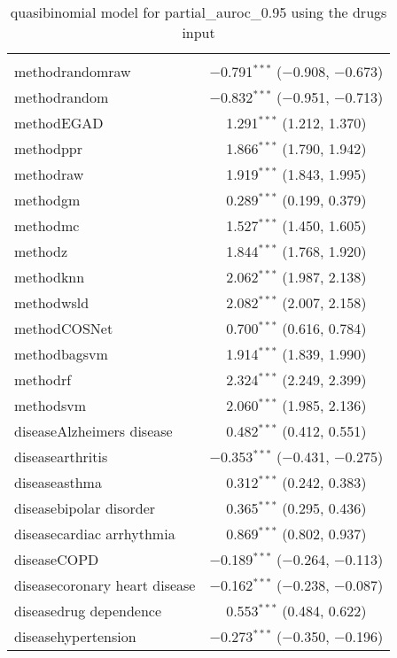 
\begin{table}[!htbp] \centering 
  \caption{quasibinomial model for partial_auroc_0.95 using the drugs input} 
  \label{} 
\begin{tabular}{@{\extracolsep{5pt}}lc} 
\\[-1.8ex]\hline 
\hline \\[-1.8ex] 
 methodrandomraw & $-$0.791$^{***}$ ($-$0.908, $-$0.673) \\ 
  methodrandom & $-$0.832$^{***}$ ($-$0.951, $-$0.713) \\ 
  methodEGAD & 1.291$^{***}$ (1.212, 1.370) \\ 
  methodppr & 1.866$^{***}$ (1.790, 1.942) \\ 
  methodraw & 1.919$^{***}$ (1.843, 1.995) \\ 
  methodgm & 0.289$^{***}$ (0.199, 0.379) \\ 
  methodmc & 1.527$^{***}$ (1.450, 1.605) \\ 
  methodz & 1.844$^{***}$ (1.768, 1.920) \\ 
  methodknn & 2.062$^{***}$ (1.987, 2.138) \\ 
  methodwsld & 2.082$^{***}$ (2.007, 2.158) \\ 
  methodCOSNet & 0.700$^{***}$ (0.616, 0.784) \\ 
  methodbagsvm & 1.914$^{***}$ (1.839, 1.990) \\ 
  methodrf & 2.324$^{***}$ (2.249, 2.399) \\ 
  methodsvm & 2.060$^{***}$ (1.985, 2.136) \\ 
  diseaseAlzheimers disease & 0.482$^{***}$ (0.412, 0.551) \\ 
  diseasearthritis & $-$0.353$^{***}$ ($-$0.431, $-$0.275) \\ 
  diseaseasthma & 0.312$^{***}$ (0.242, 0.383) \\ 
  diseasebipolar disorder & 0.365$^{***}$ (0.295, 0.436) \\ 
  diseasecardiac arrhythmia & 0.869$^{***}$ (0.802, 0.937) \\ 
  diseaseCOPD & $-$0.189$^{***}$ ($-$0.264, $-$0.113) \\ 
  diseasecoronary heart disease & $-$0.162$^{***}$ ($-$0.238, $-$0.087) \\ 
  diseasedrug dependence & 0.553$^{***}$ (0.484, 0.622) \\ 
  diseasehypertension & $-$0.273$^{***}$ ($-$0.350, $-$0.196) \\ 

\end{tabular}
\end{table}
